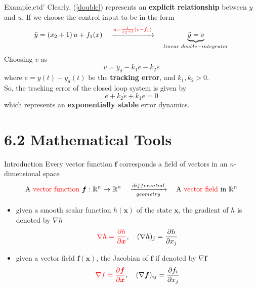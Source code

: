 \documentclass{beamer}
\renewcommand{\vec}[1]{\ensuremath{\boldsymbol{#1}}} %
\begin{document}
\begin{frame}{Example,ctd'}
    Clearly, (\ref{double}) represents an \textbf{explicit relationship} between {\color{red}$y$} and {\color{red}$u$}.  If we choose the control input to be in the form
    $$
         \ddot{y}=\left(x_{2}+1\right) u+f_{1}(x) \quad \xrightarrow{ {\color{red}u=\frac{1}{x_{2}+1}\left(v-f_{1}\right)}} \quad \underbrace{\ddot{y} = v}_{\tiny linear~double-integrator}
    $$
Choosing $v$ as
\begin{equation}\label{choose-v}
  v = \ddot{y}_{d}-k_{1}e-k_{2}\dot{e}
\end{equation}
where $e=y(t)-y_{d}(t)$ be the \textbf{tracking error}, and $k_{1}, k_{2} > 0$.\\
So, the tracking error of the closed loop system is given by
$$
\ddot{e}+k_{2} \dot{e}+k_{1} e = 0
$$
which represents an \textbf{exponentially stable} error dynamics.
\end{frame}



\section{6.2  Mathematical Tools}

\begin{frame}{Introduction}
Every vector function \vec{f} corresponds a field of vectors in an $n$-dimensional space
$$
\text{A {\color{red}vector function}}~\vec{f}:\mathbb{R}^{n}\rightarrow \mathbb{R}^{n} \quad \xrightarrow[geometry]{differential} \quad \text{A {\color{red}vector field} in}~ \mathbb{R}^{n}
$$

\begin{itemize}
  \item given a smooth scalar function $h(\vec{x})$ of the state \vec{x}, the gradient of $h$ is denoted by $\nabla h$
      $$
      {\color{red}\nabla h = \frac{\partial h}{\partial \vec{x}}}, \quad (\nabla h)_{j} = \frac{\partial h}{\partial x_{j}}
      $$
  \item given a vector field $\vec{f}(\vec{x})$, the Jacobian of \vec{f} if denoted by $\nabla \vec{f}$
      $$
      {\color{red}\nabla f = \frac{\partial \vec{f}}{\partial \vec{x}}}, \quad (\nabla \vec{f})_{ij} = \frac{\partial f_{i}}{\partial x_{j}}
      $$
\end{itemize}
\end{frame}
\end{document}
